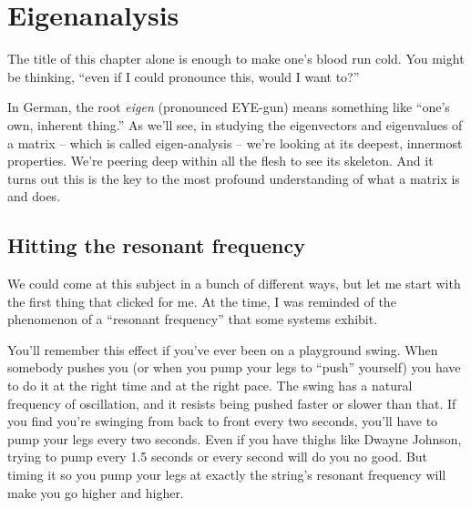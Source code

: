 
\chapter{Eigenanalysis}
\label{ch:eigen}

The title of this chapter alone is enough to make one's blood run cold. You
might be thinking, ``even if I could pronounce this, would I want to?''

In German, the root \textit{eigen} (pronounced EYE-gun) means something like
``one's own, inherent thing.'' As we'll see, in studying the eigenvectors and
eigenvalues of a matrix -- which is called eigen-analysis -- we're looking at
its deepest, innermost properties. We're peering deep within all the flesh to
see its skeleton. And it turns out this is the key to the most profound
understanding of what a matrix is and does.

\section{Hitting the resonant frequency}


We could come at this subject in a bunch of different ways, but let me start
with the first thing that clicked for me. At the time, I was reminded of the
phenomenon of a ``resonant frequency'' that some systems exhibit.


You'll remember this effect if you've ever been on a playground swing. When
somebody pushes you (or when you pump your legs to ``push'' yourself) you have
to do it at the right time and at the right pace. The swing has a natural
frequency of oscillation, and it resists being pushed faster or slower than
that. If you find you're swinging from back to front every two seconds, you'll
have to pump your legs every two seconds. Even if you have thighs like Dwayne
Johnson, trying to pump every 1.5 seconds or every second will do you no good.
But timing it so you pump your legs at exactly the string's resonant frequency
will make you go higher and higher.


